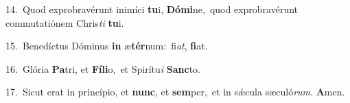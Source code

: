{\numbfont\textcolor{\numbcolor}{14.}}~Quod exprobravérunt inimíci \textbf{tu}\-i, \textbf{Dó}\-\textbf{mi}ne,~\star quod exprobravérunt commutatiónem Chris\textit{ti} \textbf{tu}\-i.\par
{\numbfont\textcolor{\numbcolor}{15.}}~Benedíctus Dóminus \textbf{in} æ\-\textbf{tér}\-num:~\star fi\-\textit{at}\-, \textbf{fi}\-at.\par
{\numbfont\textcolor{\numbcolor}{16.}}~Glória \textbf{Pa}\-tri, et \textbf{Fí}\-\textbf{li}o,~\star et Spirítu\textit{i} \textbf{Sanc}\-to.\par
{\numbfont\textcolor{\numbcolor}{17.}}~Sicut erat in princípio, et \textbf{nunc}\-, et \textbf{sem}\-per,~\star et in sǽcula sæculó\-\textit{rum}\-. \textbf{A}\-men.\par
